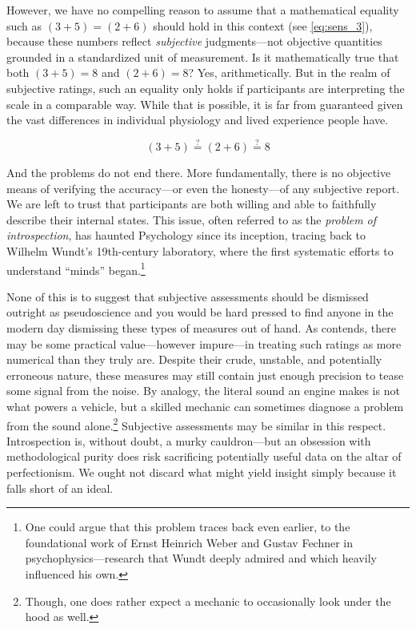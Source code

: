 \noindent
However, we have no compelling reason to assume that a mathematical equality such as $(3 + 5) = (2 + 6)$ should hold in this context (see \ref{eq:sens_3}), because these numbers reflect \textit{subjective} judgments—not objective quantities grounded in a standardized unit of measurement. Is it mathematically true that both $(3 + 5) = 8$ and $(2 + 6) = 8$? Yes, arithmetically. But in the realm of subjective ratings, such an equality only holds if participants are interpreting the scale in a comparable way. While that is possible, it is far from guaranteed given the vast differences in individual physiology and lived experience people have.

\begin{equation}
(3 + 5) \stackrel{?}{=} (2 + 6) \stackrel{?}{=} 8
\label{eq:sens_3}
\end{equation}

\noindent
And the problems do not end there. More fundamentally, there is no objective means of verifying the accuracy—or even the honesty—of any subjective report. We are left to trust that participants are both willing and able to faithfully describe their internal states. This issue, often referred to as the \textit{problem of introspection}, has haunted Psychology since its inception, tracing back to Wilhelm Wundt’s 19th-century laboratory, where the first systematic efforts to understand ``minds'' began.\footnote{One could argue that this problem traces back even earlier, to the foundational work of Ernst Heinrich Weber and Gustav Fechner in psychophysics—research that Wundt deeply admired and which heavily influenced his own.}

None of this is to suggest that subjective assessments should be dismissed outright as pseudoscience and you would be hard pressed to find anyone in the modern day dismissing these types of measures out of hand. As \textcite{Labovitz1967} contends, there may be some practical value—however impure—in treating such ratings as more numerical than they truly are. Despite their crude, unstable, and potentially erroneous nature, these measures may still contain just enough precision to tease some signal from the noise. By analogy, the literal sound an engine makes is not what powers a vehicle, but a skilled mechanic can sometimes diagnose a problem from the sound alone.\footnote{Though, one does rather expect a mechanic to occasionally look under the hood as well.} Subjective assessments may be similar in this respect. Introspection is, without doubt, a murky cauldron—but an obsession with methodological purity does risk sacrificing potentially useful data on the altar of perfectionism. We ought not discard what might yield insight simply because it falls short of an ideal.

